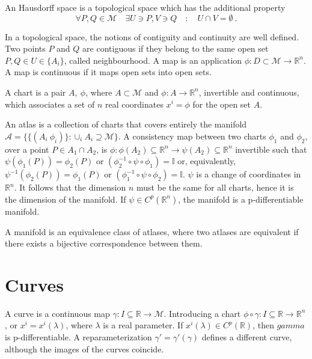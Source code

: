     \begin{definition}
    An Hausdorff space is a topological space which has the additional property  
    \begin{equation*}
        \forall P, Q \in \mathcal M \quad \exists U \ni P, V \ni Q \quad \colon \quad U \cap V = \emptyset ~.
    \end{equation*}
    \end{definition}

    In a topological space, the notions of contiguity and continuity are well defined. Two points $P$ and $Q$ are contiguous if they belong to the same open set $P, Q \in U \in \{A_i\}$, called neighbourhood. A map is an application $\phi \colon D \subset \mathcal M \rightarrow \mathbb R^n$. A map is continuous if it maps open sets into open sets. 

    \hfill

    A chart is a pair $A, ~\phi$, where $A \subset \mathcal M$ and $\phi \colon A \rightarrow \mathbb R^n$, invertible and continuous, which associates a set of $n$ real coordinates $x^i = \phi$ for the open set $A$. 
    
    An atlas is a collection of charts that covers entirely the manifold $\mathcal A = \{\{(A_i ~\phi_i)\} \colon \cup_i A_i \supseteq \mathcal M \} $. A consistency map between two charts $\phi_1$ and $\phi_2$, over a point $P \in A_1 \cap A_2$, is $\phi \colon \phi(A_2) \subseteq \mathbb R^n \rightarrow \psi(A_2) \subseteq \mathbb R^n $ invertible such that $\psi(\phi_1(P)) = \phi_2(P)$ or $(\phi_2^{-1} \circ \psi \circ \phi_1) = \mathbb I$ or, equivalently, $\psi^{-1} (\phi_2(P)) = \phi_1(P)$ or $(\phi_1^{-1} \circ \psi \circ \phi_2) = \mathbb I$. $\psi$ is a change of coordinates in $\mathbb R^n$. It follows that the dimension $n$ must be the same for all charts, hence it is the dimension of the manifold. If $\psi \in C^p(\mathbb R^n)$, the manifold is a p-differentiable manifold.

    A manifold is an equivalence class of atlases, where two atlases are equivalent if there exists a bijective correspondence between them.

\section{Curves}

    A curve is a continuous map $\gamma \colon I \subseteq \mathbb R \rightarrow \mathcal M$. Introducing a chart $\phi \circ \gamma \colon I \subseteq \mathbb R \rightarrow \mathbb R^n$, or $x^i = x^i(\lambda)$, where $\lambda$ is a real parameter. If $x^i(\lambda) \in C^p(\mathbb R)$, then $gamma$ is p-differentiable. A reparameterization $\gamma' = \gamma'(\gamma)$ defines a different curve, although the images of the curves coincide.

